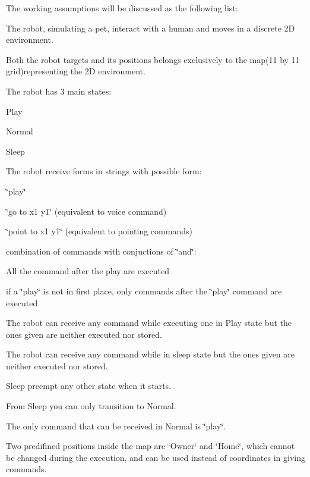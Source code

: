 The working assumptions will be discussed as the following list\+:
\begin{DoxyItemize}
\item The robot, simulating a pet, interact with a human and moves in a discrete 2D environment.
\item Both the robot targets and its positions belongs exclusively to the map(11 by 11 grid)representing the 2D environment.
\item The robot has 3 main states\+:
\begin{DoxyItemize}
\item Play
\item Normal
\item Sleep
\end{DoxyItemize}
\item The robot receive forms in strings with possible form\+:
\begin{DoxyItemize}
\item \char`\"{}play\char`\"{}
\item \char`\"{}go to x1 y1\char`\"{} (equivalent to voice command)
\item \char`\"{}point to x1 y1\char`\"{} (equivalent to pointing commands)
\item combination of commands with conjuctions of \char`\"{}and\char`\"{}\+:
\begin{DoxyItemize}
\item All the command after the play are executed
\item if a \char`\"{}play\char`\"{} is not in first place, only commands after the \char`\"{}play\char`\"{} command are executed
\end{DoxyItemize}
\end{DoxyItemize}
\item The robot can receive any command while executing one in Play state but the ones given are neither executed nor stored.
\item The robot can receive any command while in sleep state but the ones given are neither executed nor stored.
\item Sleep preempt any other state when it starts.
\item From Sleep you can only transition to Normal.
\item The only command that can be received in Normal is \char`\"{}play\char`\"{}.
\item Two predifined positions inside the map are \char`\"{}\+Owner\char`\"{} and \char`\"{}\+Home\char`\"{}, which cannot be changed during the execution, and can be used instead of coordinates in giving commands.
\end{DoxyItemize}

